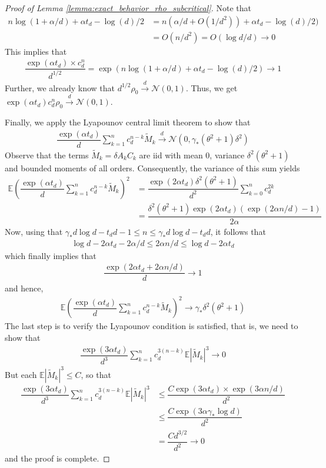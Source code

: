 \documentclass[12pt]{article}
\def\gN{{\mathcal{N}}}
\newcommand{\E}{\mathbb{E}}
\begin{document}
\begin{proof}[Proof of Lemma \ref{lemma:exact_behavior_rho_subcritical}]
    Note that
    \begin{align*}
    n\log(1+\alpha/d)+\alpha t_d-\log(d)/{2} &= n(\alpha/d + O(1/d^2)) +\alpha t_d -\log(d)/2)\\
    &=O(n/d^2)=O(\log d/d)\to 0
    \end{align*}This implies that 
    \begin{align*}
        \dfrac{\exp(\alpha t_d)\times c_d^n}{d^{1/2}}= \exp\left(n\log(1+\alpha/d)+\alpha t_d-\log(d)/{2}\right)\to 1
    \end{align*}Further, we already know that $d^{1/2}\rho_0\stackrel{d}{\to}\gN(0,1)$. Thus, we get $\exp(\alpha t_d)c_d^n\rho_0\stackrel{d}{\to}\gN(0,1)$.

    Finally, we apply the Lyapounov central limit theorem to show that
\begin{align*}
    \dfrac{\exp(\alpha t_d)}{d}\sum_{k=1}^n c_d^{n-k}\tilde M_k\stackrel{d}{\to}\gN(0,\gamma_*(\theta^2+1)\delta^2)
\end{align*} Observe that the terms $\tilde M_k=\delta A_kC_k$ are iid with mean $0$, variance $\delta^2(\theta^2+1)$ and bounded moments of all orders. Consequently, the variance of this sum yields
\begin{align*}
    \E\left(\dfrac{\exp(\alpha t_d)}{d}\sum_{k=1}^nc_d^{n-k}\tilde M_k\right)^2 &= \dfrac{\exp(2\alpha t_d)\delta^2(\theta^2+1)}{d^2}\sum_{k=0}^n c_d^{2k}\\
    &=\dfrac{\delta^2(\theta^2+1)\exp(2\alpha t_d)(\exp(2\alpha n/d)-1)}{2\alpha}
\end{align*}Now, using that $\gamma_*d\log d-t_d d-1\leq n\leq \gamma_*d\log d-t_d d$, it follows that
\begin{align*}
    \log d - 2\alpha t_d - 2\alpha/d \leq 2\alpha n/d\leq \log d - 2\alpha t_d
\end{align*}which finally implies that
\begin{align*}
    \dfrac{\exp(2\alpha t_d + 2\alpha n/d) }{d}\to 1
\end{align*}and hence, 
\begin{align*}
    \E\left(\dfrac{\exp(\alpha t_d)}{d}\sum_{k=1}^nc_d^{n-k}\tilde M_k\right)^2 \to \gamma_*\delta^2(\theta^2+1)
\end{align*} The last step is to verify the Lyapounov condition is satisfied, that is, we need to show that
\begin{align*}
    \dfrac{\exp(3\alpha t_d)}{d^3}\sum_{k=1}^nc_d^{3(n-k)}\E|\tilde M_k|^3\to 0
\end{align*}But each $\E|\tilde M_k|^3\leq C$, so that
\begin{align*}
    \dfrac{\exp(3\alpha t_d)}{d^3}\sum_{k=1}^nc_d^{3(n-k)}\E|\tilde M_k|^3 &\leq \dfrac{C\exp(3\alpha t_d)\times \exp(3\alpha n/d)}{d^2}\\
    &\leq \dfrac{C\exp(3\alpha \gamma_*\log d)}{d^2}\\
    &=\dfrac{Cd^{3/2}}{d^2}\to 0
\end{align*}and the proof is complete.\end{proof}
\end{document}
